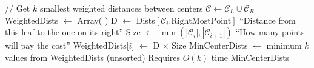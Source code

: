 \documentclass{article}
\theoremstyle{definition}
\begin{document}
\begin{algorithm}
\begin{algorithmic}[1]
    \State // Get $k$ smallest weighted distances between centers
    \State $\mathcal{C} \gets \mathcal{C}_L \cup \mathcal{C}_R$
    \State WeightedDists $\gets$ Array( )
        \State D $\gets$ Dists$ [\mathcal{C}_i\text{.RightMostPoint}]$ \Comment ``Distance from this leaf to the one on its right''
        \State Size $\gets$ $\min(|\mathcal{C}_i|, |\mathcal{C}_{i+1}|)$ \Comment ``How many points will pay the cost''
        \State WeightedDists[$i$] $\gets$ D $\times$ Size
    \EndFor
    \State MinCenterDists $\gets$ minimum $k$ values from WeightedDists (unsorted) \Comment Requires $O(k)$ time
    \State \Return MinCenterDists
\EndFunction

\end{algorithmic}
\end{algorithm}
% 
% 
% 
% 
\end{document}
